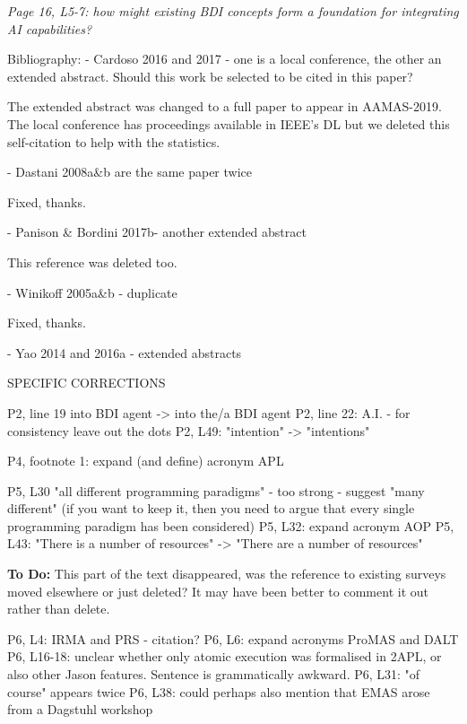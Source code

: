 \documentclass[12pt]{article}
\newenvironment{reviews}{\bigskip\itshape}{\upshape\bigskip}
\newenvironment{response}{\bigskip\normalfont}{\bigskip}
\newcommand{\tbd}[1]{\textsf{\textbf{To Do:} #1}}
\begin{document}
\begin{reviews}
Page 16, L5-7: how might existing BDI concepts form a foundation for integrating AI capabilities? 

Bibliography:
- Cardoso 2016 and 2017 - one is a local conference, the other an extended abstract. Should this work be selected to be cited in this paper?

\begin{response}
The extended abstract was changed to a full paper to appear in AAMAS-2019. The local conference has proceedings available in IEEE's DL but we deleted this self-citation to help with the statistics.
\end{response}

- Dastani 2008a\&b are the same paper twice 

\begin{response}
Fixed, thanks.
\end{response}

- Panison \& Bordini 2017b- another extended abstract 

\begin{response}
This reference was deleted too.
\end{response}

- Winikoff 2005a\&b - duplicate

\begin{response}
Fixed, thanks.
\end{response}

- Yao 2014 and 2016a - extended abstracts 

SPECIFIC CORRECTIONS 

P2, line 19 into BDI agent -> into the/a BDI agent
P2, line 22: A.I. - for consistency leave out the dots
P2, L49: "intention" -> "intentions"

P4, footnote 1: expand (and define) acronym APL

P5, L30 "all different programming paradigms" - too strong - suggest "many different" (if you want to keep it, then you need to argue that every single programming paradigm has been considered)
P5, L32: expand acronym AOP
P5, L43: "There is a number of resources" -> "There are a number of resources"

\tbd{This part of the text disappeared, was the reference to existing surveys moved elsewhere or just deleted? It may have been better to comment it out rather than delete.}

P6, L4: IRMA and PRS - citation?
P6, L6: expand acronyms ProMAS and DALT
P6, L16-18: unclear whether only atomic execution was formalised in 2APL, or also other Jason features. Sentence is grammatically awkward.
P6, L31: "of course" appears twice 
P6, L38: could perhaps also mention that EMAS arose from a Dagstuhl workshop


\end{reviews}
\end{document}
